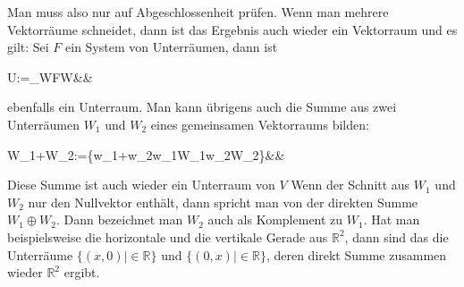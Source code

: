 \documentclass[12pt]{article}
\begin{document}
		\noindent Man muss also nur auf Abgeschlossenheit prüfen. Wenn man mehrere Vektorräume schneidet, dann ist das Ergebnis auch wieder ein Vektorraum und es gilt: Sei $F$ ein System von Unterräumen, dann ist
		\begin{flalign*}
			U:=\bigcap_{W\in F}W&&
		\end{flalign*}
		ebenfalls ein Unterraum. Man kann übrigens auch die Summe aus zwei Unterräumen $W_1$ und $W_2$ eines gemeinsamen Vektorraums bilden:
		\begin{flalign*}
			W_1+W_2:=\{w_1+w_2\mid w_1\in W_1\land w_2\in W_2\}&&
		\end{flalign*}
		Diese Summe ist auch wieder ein Unterraum von $V$ Wenn der Schnitt aus $W_1$ und $W_2$ nur den Nullvektor enthält, dann spricht man von der direkten Summe $W_1\oplus W_2$. Dann bezeichnet man $W_2$ auch als Komplement zu $W_1$. Hat man beispielsweise die horizontale und die vertikale Gerade aus $\mathbb{R}^2$, dann sind das die Unterräume $\{(x,0)\mid\in\mathbb{R}\}$ und $\{(0,x)\mid\in\mathbb{R}\}$, deren direkt Summe zusammen wieder $\mathbb{R}^2$ ergibt.
\end{document}
